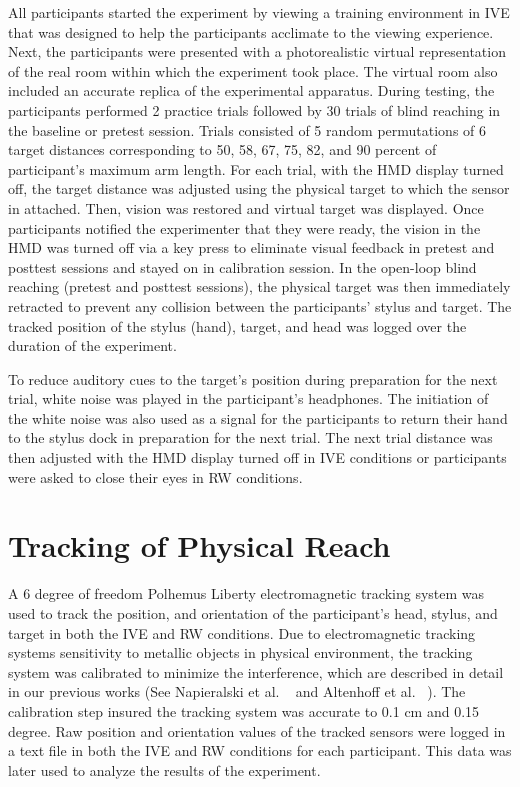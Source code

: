 All participants started the experiment by viewing a training environment in IVE that was designed to help the participants acclimate to the viewing experience. Next, the participants were presented with a photorealistic virtual representation of the real room within which the experiment took place. The virtual room also included an accurate replica of the experimental apparatus. During testing, the participants performed 2 practice trials followed by 30 trials of blind reaching in the baseline or pretest session. Trials consisted of 5 random permutations of 6 target distances corresponding to 50, 58, 67, 75, 82, and 90 percent of participant's maximum arm length. For each trial, with the HMD display turned off, the target distance was adjusted using the physical target to which the sensor in attached. Then, vision was restored and virtual target was displayed. Once participants notified the experimenter that they were ready, the vision in the HMD was turned off via a key press to eliminate visual feedback in pretest and posttest sessions and stayed on in calibration session. In the open-loop blind reaching (pretest and posttest sessions), the physical target was then immediately retracted to prevent any collision between the participants' stylus and target. The tracked position of the stylus (hand), target, and head was logged over the duration of the experiment.

To reduce auditory cues to the target's position during preparation for the next trial, white noise was played in the participant's headphones. The initiation of the white noise was also used as a signal for the participants to return their hand to the stylus dock in preparation for the next trial. The next trial distance was then adjusted with the HMD display turned off in IVE conditions or participants were asked to close their eyes in RW conditions. 

\section{Tracking of Physical Reach}
A 6 degree of freedom Polhemus Liberty electromagnetic tracking system was used to track the position, and orientation of the participant’s head, stylus, and target in both the IVE and RW conditions. Due to electromagnetic tracking systems sensitivity to metallic objects in physical environment, the tracking system was calibrated to minimize the interference, which are described in detail in our previous works (See Napieralski et al. ~\cite{NAB+11} and Altenhoff et al. ~\cite{ANL+12}). The calibration step insured the tracking system was accurate to 0.1 cm and 0.15 degree. Raw position and orientation values of the tracked sensors were logged in a text file in both the IVE and RW conditions for each participant. This data was later used to analyze the results of the experiment.

